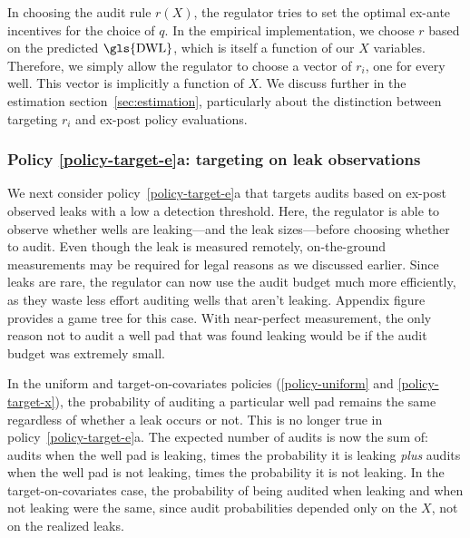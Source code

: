 In choosing the audit rule \(r(X)\), the regulator tries to set the optimal ex-ante incentives for the choice of \(q\).
In the empirical implementation, we choose \(r\) based on the predicted \(\text{\gls{DWL}}\), which is itself a function of our \(X\) variables.
Therefore, we simply allow the regulator to choose a vector of \(r_i\), one for every well.
This vector is implicitly a function of \(X\).
We discuss further in the estimation section~\ref{sec:estimation},
particularly about the distinction between targeting  \(r_i\) and ex-post policy evaluations.

\subsubsection{Policy \ref{policy-target-e}a: targeting on leak observations}
\label{sec:audit-target-e-low-threshold}

We next consider policy~\ref{policy-target-e}a that targets audits based on ex-post observed leaks with a low a detection threshold.
Here, the regulator is able to observe whether wells are leaking---and the leak sizes---before choosing whether to audit.
Even though the leak is measured remotely, on-the-ground measurements may be required for legal reasons as we discussed earlier.
Since leaks are rare, the regulator can now use the audit budget much more efficiently, as they waste less effort auditing wells that aren't leaking.
Appendix figure~\iftoggle{usexr}{\ref{fig:game-tree-target-e-no-censor}}{A2} provides a game tree for this case.
With near-perfect measurement, the only reason not to audit a well pad that was found leaking would be if the audit budget was extremely small.

In the uniform and target-on-covariates policies (\ref{policy-uniform} and \ref{policy-target-x}),  the probability of auditing a particular well pad remains the same regardless of whether a leak occurs or not.
This is no longer true in policy~\ref{policy-target-e}a.
The expected number of audits is now the sum of:
audits when the well pad is leaking, times the probability it is leaking
\textit{plus}
audits when the well pad is not leaking, times the probability it is not leaking.
In the target-on-covariates case, the probability of being audited when leaking and when not leaking were the same, since audit probabilities depended only on the \(X\), not on the realized leaks.

